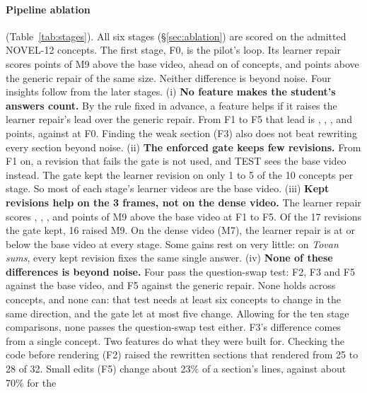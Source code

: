 \paragraph{Pipeline ablation} (Table~\ref{tab:stages}). All six stages (\S\ref{sec:ablation}) are scored on the
admitted NOVEL-12 concepts. The first stage, F0, is the pilot's loop. Its learner repair scores \NMRepair{} points of
M9 above the base video, ahead on \NMRepairPos{} of \NMRepairN{} concepts, and \NMRepairGeneric{} points above the
generic repair of the same size. Neither difference is beyond noise. Four insights follow from the later stages.
(i) \textbf{No feature makes the student's answers count.} By the rule fixed in advance, a feature helps if it
raises the learner repair's lead over the generic repair. From F1 to F5 that lead is \NMStageOneGeneric{},
\NMStageTwoGeneric{}, \NMStageThreeGeneric{}, \NMStageFourGeneric{} and \NMStageFiveGeneric{} points, against
\NMRepairGeneric{} at F0. Finding the weak section (F3) also does not beat rewriting every section beyond noise.
(ii) \textbf{The enforced gate keeps few revisions.} From F1 on, a revision that fails the gate is not used, and TEST
sees the base video instead. The gate kept the learner revision on only 1 to 5 of the 10 concepts per stage. So most
of each stage's learner videos are the base video.
(iii) \textbf{Kept revisions help on the 3 frames, not on the dense video.} The learner repair scores
\NMStageOne{}, \NMStageTwo{}, \NMStageThree{}, \NMStageFour{} and \NMStageFive{} points of M9 above the base video at
F1 to F5. Of the 17 revisions the gate kept, 16 raised M9. On the dense video (M7), the learner repair is at or below
the base video at every stage. Some gains rest on very little: on \emph{Tovan sums}, every kept revision fixes the same
single answer.
(iv) \textbf{None of these differences is beyond noise.} Four pass the question-swap test: F2, F3 and F5 against
the base video, and F5 against the generic repair. None holds across concepts, and none can: that test needs at least
six concepts to change in the same direction, and the gate let at most five change. Allowing for the ten stage
comparisons, none passes the question-swap test either. F3's difference comes from a single concept.
Two features do what they were built for. Checking the code before rendering (F2) raised the rewritten sections that
rendered from 25 to 28 of 32. Small edits (F5) change about 23\% of a section's lines, against about 70\% for the
